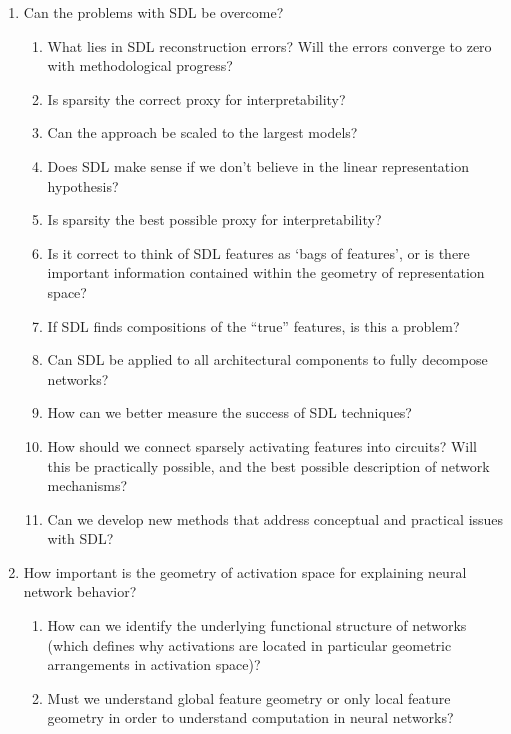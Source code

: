 \begin{enumerate}
    \item Can the problems with SDL be overcome?
    \begin{enumerate}[label=\alph*.]
        \item What lies in SDL reconstruction errors? Will the errors converge to zero with methodological progress?
        \item Is sparsity the correct proxy for interpretability?
        \item Can the approach be scaled to the largest models?
        \item Does SDL make sense if we don't believe in the linear representation hypothesis?
        \item Is sparsity the best possible proxy for interpretability?
        \item Is it correct to think of SDL features as `bags of features', or is there important information contained within the geometry of representation space?
        \item If SDL finds compositions of the “true” features, is this a problem?
        \item Can SDL be applied to all architectural components to fully decompose networks?
        \item How can we better measure the success of SDL techniques?
        \item How should we connect sparsely activating features into circuits? Will this be practically possible, and the best possible description of network mechanisms?
        \item Can we develop new methods that address conceptual and practical issues with SDL?
    \end{enumerate}
    
    \item How important is the geometry of activation space for explaining neural network behavior?
    \begin{enumerate}[label=\alph*.]
        \item How can we identify the underlying functional structure of networks (which defines why activations are located in particular geometric arrangements in activation space)?
        \item Must we understand global feature geometry or only local feature geometry in order to understand computation in neural networks?
    \end{enumerate}
    

\end{enumerate}
